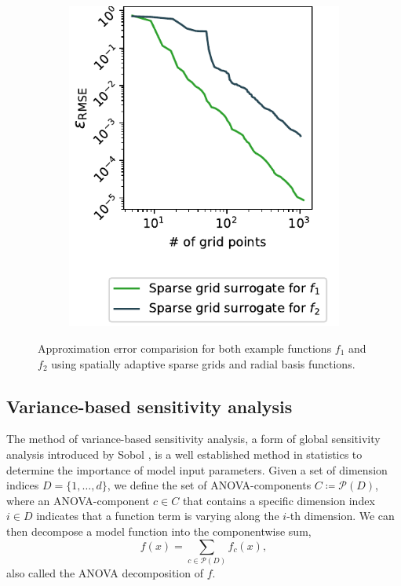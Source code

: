 \documentclass[
  a4paper,  %
  twoside,  %
  bibliography=totoc,
  headsepline,
  cleardoublepage=empty,
  parskip=half,
  draft=false
]{scrbook}
\begin{document}
\begin{mdframed}[style=style]
\begin{figure}[H]
\begin{subfigure}{.5\textwidth}
  \includegraphics[width=\linewidth]{graphics/grid_approx_f2}
  \label{fig:grid_approx_f2}
\vspace{2.5mm}
\end{subfigure}
  \delimit
\caption{
Approximation error comparision for both example functions $f_1$ and $f_2$ using spatially adaptive sparse grids and radial basis functions.}
  \label{fig:dim_reduction_errors}
\end{figure}
\end{mdframed}

\subsection{Variance-based sensitivity analysis}

The method of variance-based sensitivity analysis, a form of global sensitivity analysis introduced by Sobol \cite{S01},  is a well established method in statistics to determine the importance of model input parameters.
Given a set of dimension indices $D=\{1,\dots,d\}$, we define the set of ANOVA-components $C \coloneqq \mathcal{P}(D)$, where an ANOVA-component $c \in C$ that contains a specific dimension index $i \in D$ indicates that a function term is varying along the $i$-th dimension.
We can then decompose a model function into the componentwise sum,
\begin{equation}
f(x)=\sum_{c \in \mathcal{P}(D)} f_{c}(x),
\label{anovaComp}
\end{equation}
also called the ANOVA decomposition of $f$.
\end{document}
